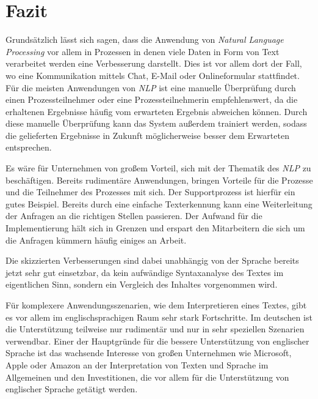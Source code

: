 \chapter{Fazit}
\label{cha:Conclusions}
Grundsätzlich lässt sich sagen, dass die Anwendung von \textit{Natural Language Processing} vor allem in Prozessen in denen viele Daten in Form von Text verarbeitet werden eine Verbesserung darstellt. Dies ist vor allem dort der Fall, wo eine Kommunikation mittels Chat, E-Mail oder Onlineformular stattfindet. Für die meisten Anwendungen von \textit{NLP} ist eine manuelle Überprüfung durch einen Prozessteilnehmer oder eine Prozessteilnehmerin empfehlenswert, da die erhaltenen Ergebnisse häufig vom erwarteten Ergebnis abweichen können. Durch diese manuelle Überprüfung kann das System außerdem trainiert werden, sodass die gelieferten Ergebnisse in Zukunft möglicherweise besser dem Erwarteten entsprechen. 

Es wäre für Unternehmen von großem Vorteil, sich mit der Thematik des \textit{NLP} zu beschäftigen. Bereits rudimentäre Anwendungen, bringen Vorteile für die Prozesse und die Teilnehmer des Prozesses mit sich. Der Supportprozess ist hierfür ein gutes Beispiel. Bereits durch eine einfache Texterkennung kann eine Weiterleitung der Anfragen an die richtigen Stellen passieren. Der Aufwand für die Implementierung hält sich in Grenzen und erspart den Mitarbeitern die sich um die Anfragen kümmern häufig einiges an Arbeit.

Die skizzierten Verbesserungen sind dabei unabhängig von der Sprache bereits jetzt sehr gut einsetzbar, da kein aufwändige Syntaxanalyse des Textes im eigentlichen Sinn, sondern ein Vergleich des Inhaltes vorgenommen wird.

Für komplexere Anwendungsszenarien, wie dem Interpretieren eines Textes, gibt es vor allem im englischsprachigen Raum sehr stark Fortschritte. Im deutschen ist die Unterstützung teilweise nur rudimentär und nur in sehr speziellen Szenarien verwendbar. Einer der Hauptgründe für die bessere Unterstützung von englischer Sprache ist das wachsende Interesse von großen Unternehmen wie Microsoft, Apple oder Amazon an der Interpretation von Texten und Sprache im Allgemeinen und den Investitionen, die vor allem für die Unterstützung von englischer Sprache getätigt werden.
